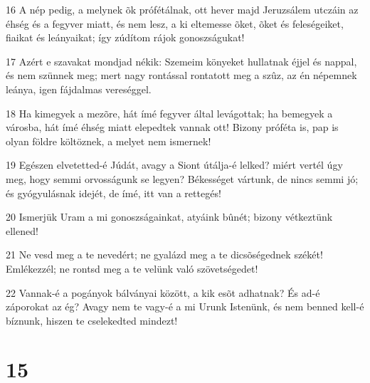 \par 16 A nép pedig, a melynek õk prófétálnak, ott hever majd Jeruzsálem utczáin az éhség és a fegyver miatt, és nem lesz, a ki eltemesse õket, õket és feleségeiket, fiaikat és leányaikat; így zúdítom rájok gonoszságukat!
\par 17 Azért e szavakat mondjad nékik: Szemeim könyeket hullatnak éjjel és nappal, és nem szünnek meg; mert nagy rontással rontatott meg a szûz, az én népemnek leánya, igen fájdalmas vereséggel.
\par 18 Ha kimegyek a mezõre, hát ímé fegyver által levágottak; ha bemegyek a városba, hát ímé éhség miatt elepedtek vannak ott! Bizony próféta is, pap is olyan földre költöznek, a melyet nem ismernek!
\par 19 Egészen elvetetted-é Júdát, avagy a Siont útálja-é lelked? miért vertél úgy meg, hogy semmi orvosságunk se legyen? Békességet  vártunk, de nincs semmi jó; és gyógyulásnak idejét, de ímé, itt van a rettegés!
\par 20 Ismerjük Uram a mi gonoszságainkat, atyáink bûnét; bizony vétkeztünk ellened!
\par 21 Ne vesd meg a te nevedért; ne gyalázd meg a te dicsõségednek  székét! Emlékezzél; ne rontsd meg a te velünk való szövetségedet!
\par 22 Vannak-é a pogányok bálványai között, a kik esõt adhatnak? És ad-é záporokat az ég? Avagy nem te vagy-é a mi Urunk Istenünk, és nem benned kell-é bíznunk, hiszen te cselekedted mindezt!

\chapter{15}

